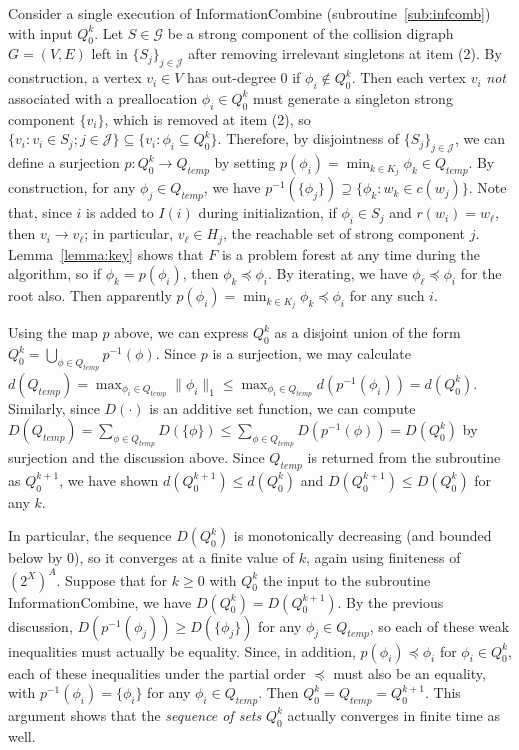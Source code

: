 \documentclass[11pt,reqno]{amsart}
\theoremstyle{definition}
\numberwithin{equation}{section}
\newcommand{\inv}{^{-1}}
\newcommand{\pre}{\phi}
\newcommand{\prealloc}{(2^X)^A}
\newcommand{\sub}{\subseteq}
\newcommand{\peq}{\preceq}
\newcommand{\strongc}{\mathcal{G}}
\newcommand{\strongcomp}{S}
\newcommand{\acto}{Q_0}
\newcommand{\actok}{Q_0^k}
\newcommand{\actt}{Q_{temp}}
\newcommand{\disto}{d}
\newcommand{\distt}{D}
\newcommand{\coll}{I}
\newcommand{\reach}{H}
\newcommand{\forest}{F}
\newcommand{\infcombgraphii}{(2)\xspace}
\begin{document}
Consider a single execution of InformationCombine (subroutine~\ref{sub:infcomb}) with input $\actok$.
Let $\strongcomp \in \strongc$ be a strong component of the collision digraph $G = (V,E)$ left in $\{\strongcomp_j\}_{j \in \mathcal{J}}$ after removing irrelevant singletons at item \infcombgraphii.
By construction, a vertex $v_i \in V$ has out-degree $0$ if $\pre_i \not \in \actok$.
Then each vertex $v_i$ \emph{not} associated with a preallocation $\pre_i \in \actok$ must generate a singleton strong component $\{v_i\}$, which is removed at item \infcombgraphii, so $\{v_i: v_i \in \strongcomp_j; j \in \mathcal{J}\} \sub \{v_i: \pre_i \sub \actok\}$. 
Therefore, by disjointness of $\{\strongcomp_j\}_{j \in \mathcal{J}}$, we can define a surjection $p: \actok \to \actt$ by setting $p(\pre_i) = \min_{k \in K_j} \pre_k \in \actt$. 
By construction, for any $\pre_j \in \actt$, we have $p\inv(\{\pre_j\}) \supseteq \{\pre_k: w_k \in c(w_j)\}$. 
Note that, since $i$ is added to $\coll(i)$ during initialization, if $\pre_i \in \strongcomp_j$ and $r(w_i) = w_{\ell}$, then $v_i \to v_{\ell}$; in particular, $v_{\ell} \in \reach_j$, the reachable set of strong component $j$.
Lemma~\ref{lemma:key} shows that $\forest$ is a problem forest at any time during the algorithm, so if $\pre_k = p(\pre_i)$, then $\pre_k \peq \pre_i$.
By iterating, we have $\pre_{\ell} \peq \pre_i$ for the root also.
Then apparently $p(\pre_i) = \min_{k \in K_j} \pre_k \peq \pre_i$ for any such $i$. 

Using the map $p$ above, we can express $\actok$ as a disjoint union of the form $\actok = \bigcup_{\pre \in \actt} p\inv(\pre)$.
Since $p$ is a surjection, we may calculate $\disto(\actt) = \max_{\pre_i \in \actt} \|\pre_i\|_1 \leq \max_{\pre_i \in \actt} \disto(p\inv(\pre_i)) = \disto(\actok)$. 
Similarly, since $\distt(\cdot)$ is an additive set function, we can compute $\distt(\actt) = \sum_{\pre \in \actt} \distt(\{\pre\}) \leq \sum_{\pre \in \actt} \distt(p\inv(\pre)) = \distt(\actok)$ by surjection and the discussion above.
Since $\actt$ is returned from the subroutine as $\acto^{k + 1}$, we have shown $\disto(\acto^{k+1}) \leq \disto(\actok)$ and $\distt(\acto^{k+1}) \leq \distt(\actok)$ for any $k$. 

In particular, the sequence $\distt(\actok)$ is monotonically decreasing (and bounded below by 0), so it converges at a finite value of $k$, again using finiteness of $\prealloc$. 
Suppose that for $k \geq 0$ with $\actok$ the input to the subroutine InformationCombine, we have $\distt(\actok) = \distt(\acto^{k+1})$.
By the previous discussion, $\distt(p\inv(\pre_j)) \geq \distt(\{\pre_j\})$ for any $\pre_j \in \actt$, so each of these weak inequalities must actually be equality. 
Since, in addition, $p(\pre_i) \peq \pre_i$ for $\pre_i \in \actok$, each of these inequalities under the partial order $\peq$ must also be an equality, with $p\inv(\pre_i) = \{\pre_i\}$ for any $\pre_i \in \actt$.
Then $\actok = \actt = \acto^{k+1}$. 
This argument shows that the \emph{sequence of sets} $\actok$ actually converges in finite time as well. 
\end{document}

